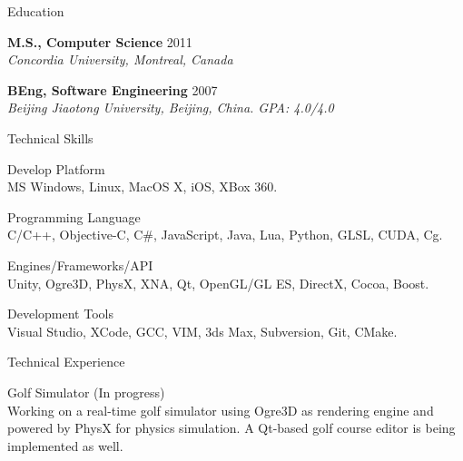 \documentclass[10pt]{article}
\newenvironment{mydescription}{%
    \begin{description}
        \setlength{\itemsep}{0.25em}%
        \setlength{\parsep}{0em}%
        \setlength{\topsep}{\itemsep}%
        \setlength{\parskip}{0em}%
        \setlength{\labelwidth}{0.1em}
        \setlength{\labelsep}{0em} 
    }%
{\end{description}}
\begin{document}
\begin{cv}
\begin{cvlist}{Education}
    \item   \textbf{M.S., Computer Science} \hfill 2011 \\ 
            \emph{Concordia University, Montreal, Canada}
    \item   \textbf{BEng, Software Engineering} \hfill 2007 \\
            \emph{Beijing Jiaotong University, Beijing, China. GPA: 4.0/4.0}
\end{cvlist}

\begin{cvlist}{Technical Skills}
\item
    \begin{mydescription} 
        \item[Develop Platform] \hfill \\
            MS Windows, Linux, MacOS X, iOS, XBox 360.
        \item[Programming Language] \hfill \\
            C/C++, Objective-C, C\#, JavaScript, Java, Lua, Python, GLSL, CUDA, Cg.
        \item [Engines/Frameworks/API] \hfill \\
            Unity, Ogre3D, PhysX, XNA, Qt, OpenGL/GL ES, DirectX, Cocoa, Boost.
        \item[Development Tools] \hfill \\
            Visual Studio, XCode, GCC, VIM, 3ds Max, Subversion, Git, CMake.
    \end{mydescription} 
\end{cvlist} 


\begin{cvlist}{Technical Experience}
\item
    \begin{mydescription}
        \item[Golf Simulator]  (In progress) \hfill \\
            Working on a real-time golf simulator using Ogre3D as rendering engine and powered by PhysX for physics simulation. A Qt-based golf course editor is being implemented as well.


\end{mydescription}
\end{cvlist}
\end{cv}
\end{document}

